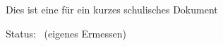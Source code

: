 \documentclass[12pt,a4paper,ngerman,numbers=noenddot,toc=listof]{scrartcl}	%
\begin{document}
\setcounter{headpages}{0}
Dies ist eine \TITEL{} für ein kurzes schulisches Dokument

\newpage
\setcounter{sectionsV}{\value{section}}		%
\appendix	%
\vfill
\printlicense
\printendsignature
\newpage\Statistiken
Status:~ (eigenes Ermessen)
  \begin{sourcefiletable}{1}
  \end{sourcefiletable}
%	
\end{document}
